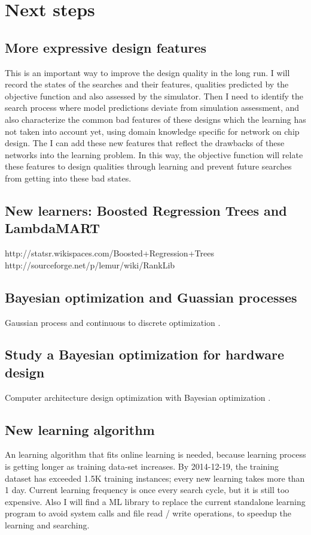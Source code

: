 \documentclass[12pt]{article}
\theoremstyle{definition}
\begin{document}
\section{Next steps}
\subsection{More expressive design features}
This is an important way to improve the design quality in the long run. I will record the states of the searches and their features, qualities predicted by the objective function and also assessed by the simulator. Then I need to identify the search process where model predictions deviate from simulation assessment, and also characterize the common bad features of these designs which the learning has not taken into account yet, using domain knowledge specific for network on chip design. The I can add these new features that reflect the drawbacks of these networks into the learning problem. In this way, the objective function will relate these features to design qualities through learning and prevent future searches from getting into these bad states.
\subsection{New learners: Boosted Regression Trees and LambdaMART}
http://statsr.wikispaces.com/Boosted+Regression+Trees\\
http://sourceforge.net/p/lemur/wiki/RankLib
\subsection{Bayesian optimization and Guassian processes}
Gaussian process and continuous to discrete optimization \cite{brochu2010tutorial}.
\subsection{Study a Bayesian optimization for hardware design}
Computer architecture design optimization with Bayesian optimization \cite{demasiusing}.
\subsection{New learning algorithm}
An learning algorithm that fits online learning is needed, because learning process is getting longer as training data-set increases. By 2014-12-19, the training dataset has exceeded 1.5K training instances; every new learning takes more than 1 day. Current learning frequency is once every search cycle, but it is still too expensive. Also I will find a ML library to replace the current standalone learning program to avoid system calls and file read / write operations, to speedup the learning and searching.
\end{document}
